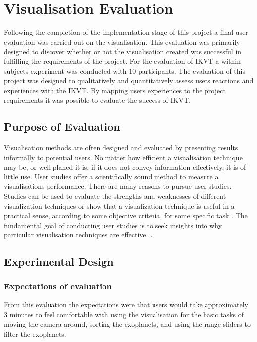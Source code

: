 \chapter{Visualisation Evaluation}\label{C:eval}
Following the completion of the implementation stage of this project a final
user evaluation was carried out on the visualisation. This evaluation was
primarily designed to discover whether or not the visualisation created was
successful in fulfilling the requirements of the project. For the evaluation of
IKVT a within subjects experiment was conducted with 10
participants. The evaluation of this project was designed to qualitatively and
quantitatively assess users
reactions and experiences with the IKVT. By mapping users experiences to the
project requirements it was possible to evaluate the success of IKVT.

\section{Purpose of Evaluation}
Visualisation methods are often designed and evaluated by presenting 
results informally to potential users. No matter how 
efficient a visualisation technique may be, or well planed it is, if it does
not convey information 
effectively, it is of little use. User studies offer a 
scientifically sound method to measure a visualisations 
performance. There are many reasons to pursue user studies. Studies can 
be used to evaluate the strengths and weaknesses of 
different visualization techniques or show that a visualization technique is 
useful in a practical sense, according to some objective 
criteria, for some specific task \cite{kosara2003thoughts}. 
The fundamental goal of conducting user studies is to 
seek insights into why particular visualisation techniques are effective.
\cite{kosara2003thoughts}.


\section{Experimental Design}
\subsection{Expectations of evaluation}
From this evaluation the expectations were that users would take approximately 3
minutes to feel comfortable with using the visualisation for the basic tasks of
moving the camera around, sorting the exoplanets, and using the range sliders to
filter the exoplanets. 


